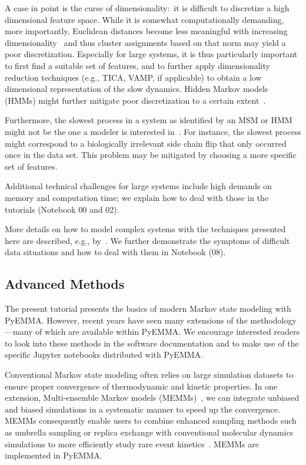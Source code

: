 \documentclass[9pt,tutorial]{livecoms}
\begin{document}
A case in point is the curse of dimensionality:~it is difficult to discretize a high dimensional feature space.
While it is somewhat computationally demanding, more importantly,
Euclidean distances become less meaningful with increasing dimensionality~\cite{aggarwal_surprising_2001}
and thus cluster assignments based on that norm may yield a poor discretization.
Especially for large systems, it is thus particularly important to first find a suitable set of features,
and to further apply dimensionality reduction techniques (e.g., TICA, VAMP, if applicable)
to obtain a low dimensional representation of the slow dynamics.
Hidden Markov models (HMMs) might further mitigate poor discretization to a certain extent~\cite{noe-proj-hid-msm}.

Furthermore, the slowest process in a system as identified by an MSM or HMM might not be the one a modeler is interested in~\cite{banushkina_nonparametric_2015}.
For instance, the slowest process might correspond to a biologically irrelevant side chain flip that only occurred once in the data set.
This problem may be mitigated by choosing a more specific set of features.

Additional technical challenges for large systems include high demands on memory and computation time;
we explain how to deal with those in the tutorials (Notebook 00 and 02).

More details on how to model complex systems with the techniques presented here are described, e.g., by~\cite{plattner_protein_2015,plattner_complete_2017}.
We further demonstrate the symptoms of difficult data situations and how to deal with them in Notebook (08).

\subsection{Advanced Methods}

The present tutorial presents the basics of modern Markov state modeling with PyEMMA. 
However, recent years have seen many extensions of the methodology---many of which are available within PyEMMA. 
We encourage interested readers to look into these methods in the software documentation and to make use of the specific Jupyter notebooks distributed with PyEMMA.

Conventional Markov state modeling often relies on large simulation datasets to ensure proper convergence of thermodynamic and kinetic properties. 
In one extension, Multi-ensemble Markov models (MEMMs)~\cite{dtram,tram},
we can integrate unbiased and biased simulations in a systematic manner to speed up the convergence. 
MEMMs consequently enable users to combine enhanced sampling methods such as umbrella sampling or replica exchange
with conventional molecular dynamics simulations to more efficiently study rare event kinetics~\cite{trammbar}. 
MEMMs are implemented in PyEMMA.
\end{document}
